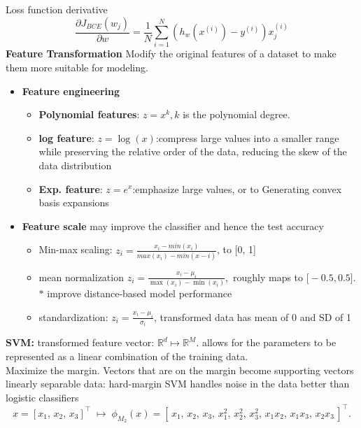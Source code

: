 \documentclass[8pt,twocolumn]{article}
\begin{document}
Loss function derivative
\[\frac{\partial J_{BCE}(w_j)}{\partial w} = \frac{1}{N} \sum_{i=1}^{N} (h_w(x^{(i)}) - y^{(i)})x_j^{(i)}\]
\textbf{Feature Transformation}
    Modify the original features of a dataset to make them more suitable for modeling.\vspace{-0.6em}
    \begin{itemize}
        \setlength{\itemsep}{0pt}
        \setlength{\parskip}{0pt}
        \item \textbf{Feature engineering}\vspace{-0.6em}
            \begin{itemize}
                \setlength{\itemsep}{0pt}
                \setlength{\parskip}{0pt}
                \item \textbf{Polynomial features}: $z = x^k, k$ is the polynomial degree.
                \item \textbf{log feature}: $z = \log(x)$:compress large values into a smaller range while preserving the relative order of the data, reducing the skew of the data distribution
                \item \textbf{Exp. feature}: $z = e^x$:emphasize large values, or to Generating convex basis expansions
            \end{itemize}
        \item \textbf{Feature scale} \vspace{-0.6em}
            may improve the classifier and hence the test accuracy
            \begin{itemize}
                \setlength{\itemsep}{0pt}
                \setlength{\parskip}{0pt}
                \item Min-max scaling: $z_i = \frac{x_i - min(x_i)}{max(x_i) - min(x-i)}$, to [0, 1]
                \item mean normalization     $
                    z_i = \frac{x_i - \mu_i}{\max(x_i) - \min(x_i)},
                  $
                  roughly maps to \(\bigl[-0.5, 0.5]\). \\ $*$  improve distance-based model performance
                \item standardization: $z_i = \frac{x_i - \mu_i}{\sigma_i}$, transformed data has mean of 0 and SD of 1
            \end{itemize}
    \end{itemize}\vspace{-0.6em}
\textbf{SVM:} transformed feature vector: $\mathbb{R}^{d} \mapsto \mathbb{R}^{M}$. allows for the  parameters to be represented as a linear combination of the training data.\\
Maximize the margin. Vectors that are on the margin become supporting vectors\\
linearly separable data: hard-margin SVM handles noise in the data better than logistic classifiers
\[
x = [x_1,\,x_2,\,x_3]^\top
\;\mapsto\;
\phi_{M_2}(x)
= [\,x_1,\,x_2,\,x_3,\,x_1^2,\,x_2^2,\,x_3^2,\,x_1x_2,\,x_1x_3,\,x_2x_3\,]^\top.
\]
\end{document}

